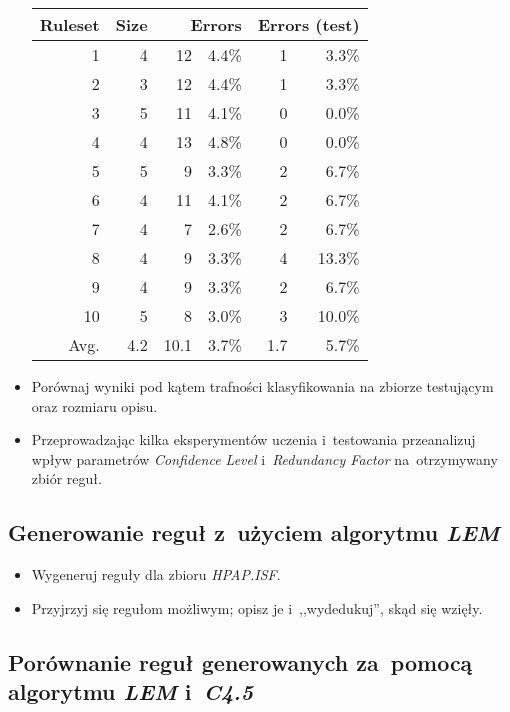 \documentclass{article}
\begin{document}
\begin{itemize}
\begin{tabular}{|r|r|rr|rr|}
\hline
 Ruleset & 
 Size & 
 \multicolumn{2}{1|}{Errors} & 
 \multicolumn{2}{1|}{Errors (test)} \\
\hline\hline
       1 &    4 &   12 & 4.4\% &    1 &  3.3\% \\
       2 &    3 &   12 & 4.4\% &    1 &  3.3\% \\
       3 &    5 &   11 & 4.1\% &    0 &  0.0\% \\
       4 &    4 &   13 & 4.8\% &    0 &  0.0\% \\
       5 &    5 &    9 & 3.3\% &    2 &  6.7\% \\
       6 &    4 &   11 & 4.1\% &    2 &  6.7\% \\
       7 &    4 &    7 & 2.6\% &    2 &  6.7\% \\
       8 &    4 &    9 & 3.3\% &    4 & 13.3\% \\
       9 &    4 &    9 & 3.3\% &    2 &  6.7\% \\
      10 &    5 &    8 & 3.0\% &    3 & 10.0\% \\
\hline\hline
    Avg. &  4.2 & 10.1 & 3.7\% &  1.7 &  5.7\% \\
\hline
\end{tabular}

\item Porównaj wyniki pod kątem trafności klasyfikowania na zbiorze testującym oraz rozmiaru opisu.
\item Przeprowadzając kilka eksperymentów uczenia i~testowania przeanalizuj wpływ parametrów \emph{Confidence Level} i~\emph{Redundancy Factor} na~otrzymywany zbiór reguł.
\end{itemize}

\subsection{Generowanie reguł z~użyciem algorytmu \emph{LEM}}

\begin{itemize}
\item Wygeneruj reguły dla zbioru \emph{HPAP.ISF}.
\item Przyjrzyj się regułom możliwym; opisz je i~,,wydedukuj'', skąd się wzięły.
\end{itemize}

\subsection{Porównanie reguł generowanych za~pomocą algorytmu \emph{LEM} i~\emph{C4.5}}
\end{document}
